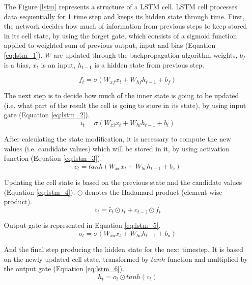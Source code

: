 The Figure \ref{lstm} represents a structure of a LSTM cell. LSTM cell processes data sequentially for 1 time step and keeps its hidden state through time. First, the network decides how much of information from previous steps to keep stored in its cell state, by using the forget gate, which consists of a sigmoid function applied to weighted sum of previous output, input and bias (Equation \ref{eq:lstm_1}). $W$ are updated through the backpropagation algorithm weights, $b_f$ is a bias, $x_t$ is an input, $h_{t-1}$ is a hidden state from previous step.

\begin{equation} \label{eq:lstm_1}
f_t = \sigma(W_{xf}x_t + W_{hf}h_{t-1}+b_f)
\end{equation}

The next step is to decide how much of the inner state is going to be updated (i.e. what part of the result the cell is going to store in its state), by using input gate (Equation \ref{eq:lstm_2}).
\begin{equation} \label{eq:lstm_2}
i_t = \sigma(W_{xi}x_t + W_{hi}h_{t-1}+b_i)
\end{equation}

After calculating the state modification, it is necessary to compute the new values (i.e. candidate values) which will be stored in it, by using activation function (Equation \ref{eq:lstm_3}).
\begin{equation} \label{eq:lstm_3}
\tilde{c_{t}}=tanh(W_{xc}x_t + W_{hc}h_{t-1} + b_c)
\end{equation}

Updating the cell state is based on the previous state and the candidate values (Equation \ref{eq:lstm_4}). $\odot$ denotes the Hadamard product (element-wise product).
\begin{equation} \label{eq:lstm_4}
c_t = \tilde{c_{t}} \odot i_t + c_{t-1} \odot f_t
\end{equation}

Output gate is represented in Equation \ref{eq:lstm_5}.
\begin{equation} \label{eq:lstm_5}
o_t = \sigma(W_{xo}x_t + W_{ho}h_{t-1}+b_o)
\end{equation}

And the final step producing the hidden state for the next timestep. It is based on the newly updated cell state, transformed by $tanh$ function and multiplied by the output gate (Equation \ref{eq:lstm_6}).
\begin{equation} \label{eq:lstm_6}
h_t = o_t \odot tanh(c_t)
\end{equation}

